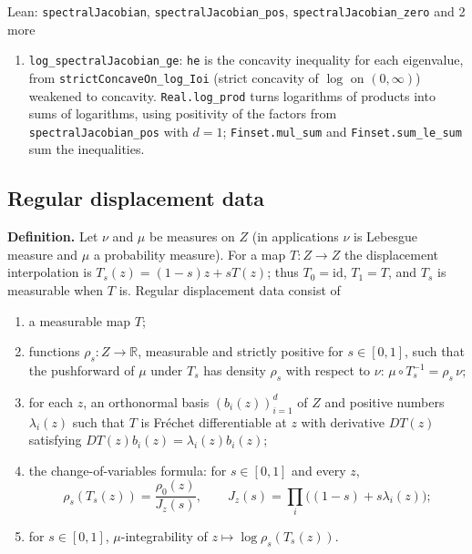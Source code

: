 \documentclass[11pt,a4paper]{report}
\begin{document}
\begin{leanbox}{Lean: \texttt{spectralJacobian}, \texttt{spectralJacobian\_\allowbreak{}pos}, \texttt{spectralJacobian\_\allowbreak{}zero} and 2 more}
\begin{enumerate}
\item \texttt{log\_\allowbreak{}spectral\allowbreak{}Jacobian\_\allowbreak{}ge}: \texttt{he} is the concavity inequality for each eigenvalue, from \texttt{strict\allowbreak{}Concave\allowbreak{}On\_\allowbreak{}log\_\allowbreak{}Ioi} (strict concavity of \(\log\) on \((0,\infty)\)) weakened to concavity. \texttt{Real.\allowbreak{}log\_\allowbreak{}prod} turns logarithms of products into sums of logarithms, using positivity of the factors from \texttt{spectral\allowbreak{}Jacobian\_\allowbreak{}pos} with \(d=1\); \texttt{Finset.\allowbreak{}mul\_\allowbreak{}sum} and \texttt{Finset.\allowbreak{}sum\_\allowbreak{}le\_\allowbreak{}sum} sum the inequalities.

\end{enumerate}
\end{leanbox}
\subsection{\texorpdfstring{Regular displacement data}{Regular displacement data}}


\textbf{Definition.} Let \(\nu\) and \(\mu\) be measures on \(Z\) (in applications \(\nu\) is Lebesgue measure and \(\mu\) a probability measure). For a map \(T:Z\to Z\) the displacement interpolation is \(T_s(z)=(1-s)z+sT(z)\); thus \(T_0=\mathrm{id}\), \(T_1=T\), and \(T_s\) is measurable when \(T\) is. Regular displacement data consist of



\begin{enumerate}


\item a measurable map \(T\);

\item functions \(\rho_s:Z\to\mathbb R\), measurable and strictly positive for \(s\in[0,1]\), such that the pushforward of \(\mu\) under \(T_s\) has density \(\rho_s\) with respect to \(\nu\): \(\mu\circ T_s^{-1}=\rho_s\,\nu\);

\item for each \(z\), an orthonormal basis \((b_i(z))_{i=1}^d\) of \(Z\) and positive numbers \(\lambda_i(z)\) such that \(T\) is Fréchet differentiable at \(z\) with derivative \(DT(z)\) satisfying \(DT(z)b_i(z)=\lambda_i(z)b_i(z)\);

\item the change-of-variables formula: for \(s\in[0,1]\) and every \(z\),
\[\rho_s(T_s(z))=\frac{\rho_0(z)}{J_z(s)},\qquad J_z(s)=\prod_i\bigl((1-s)+s\lambda_i(z)\bigr);\]

\item for \(s\in[0,1]\), \(\mu\)-integrability of \(z\mapsto\log\rho_s(T_s(z))\).

\end{enumerate}
\end{document}
